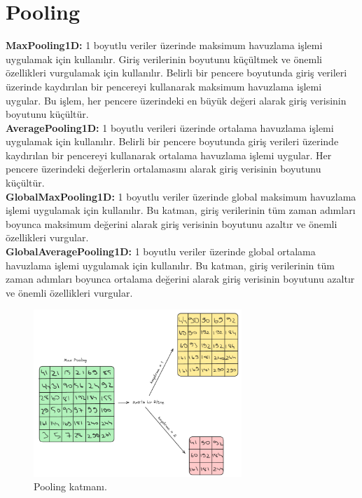 \section{Pooling}
\textbf{MaxPooling1D:} 1 boyutlu veriler üzerinde maksimum havuzlama işlemi uygulamak için kullanılır. Giriş verilerinin boyutunu küçültmek ve önemli özellikleri vurgulamak için kullanılır. Belirli bir pencere boyutunda giriş verileri üzerinde kaydırılan bir pencereyi kullanarak maksimum havuzlama işlemi uygular. Bu işlem, her pencere üzerindeki en büyük değeri alarak giriş verisinin boyutunu küçültür.\\
\textbf{AveragePooling1D:} 1 boyutlu verileri üzerinde ortalama havuzlama işlemi uygulamak için kullanılır. Belirli bir pencere boyutunda giriş verileri üzerinde kaydırılan bir pencereyi kullanarak ortalama havuzlama işlemi uygular. Her pencere üzerindeki değerlerin ortalamasını alarak giriş verisinin boyutunu küçültür.\\
\textbf{GlobalMaxPooling1D:} 1 boyutlu veriler üzerinde global maksimum havuzlama işlemi uygulamak için kullanılır. Bu katman, giriş verilerinin tüm zaman adımları boyunca maksimum değerini alarak giriş verisinin boyutunu azaltır ve önemli özellikleri vurgular.\\
\textbf{GlobalAveragePooling1D:} 1 boyutlu veriler üzerinde global ortalama havuzlama işlemi uygulamak için kullanılır. Bu katman, giriş verilerinin tüm zaman adımları boyunca ortalama değerini alarak giriş verisinin boyutunu azaltır ve önemli özellikleri vurgular.

\begin{figure}[h]
    \centering
    \includegraphics[width=0.7\textwidth]{images/pooling_layer.png}
    \caption{Pooling katmanı.}
    \label{fig:enter-label}
\end{figure}

